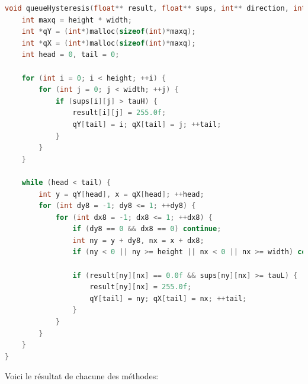 \documentclass{article}
\begin{document}
\begin{lstlisting}[language=C]
void queueHysteresis(float** result, float** sups, int** direction, int width, int height, float tauL, float tauH) {
    int maxq = height * width;
    int *qY = (int*)malloc(sizeof(int)*maxq);
    int *qX = (int*)malloc(sizeof(int)*maxq);
    int head = 0, tail = 0;

    for (int i = 0; i < height; ++i) {
        for (int j = 0; j < width; ++j) {
            if (sups[i][j] > tauH) {
                result[i][j] = 255.0f;
                qY[tail] = i; qX[tail] = j; ++tail;
            }
        }
    }

    while (head < tail) {
        int y = qY[head], x = qX[head]; ++head;
        for (int dy8 = -1; dy8 <= 1; ++dy8) {
            for (int dx8 = -1; dx8 <= 1; ++dx8) {
                if (dy8 == 0 && dx8 == 0) continue;
                int ny = y + dy8, nx = x + dx8;
                if (ny < 0 || ny >= height || nx < 0 || nx >= width) continue;

                if (result[ny][nx] == 0.0f && sups[ny][nx] >= tauL) {
                    result[ny][nx] = 255.0f;
                    qY[tail] = ny; qX[tail] = nx; ++tail;
                }
            }
        }
    }  
}
\end{lstlisting}
Voici le résultat de chacune des méthodes:
\end{document}
